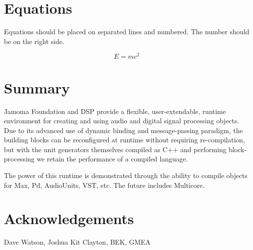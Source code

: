 \documentclass[twoside,10pt]{article}
\begin{document}
\section{Equations} %

Equations should be placed on separated lines and numbered.
The number should be on the right side.

\begin{equation}
E=mc^{2}
\end{equation}




\section{Summary} %

Jamoma Foundation and DSP provide a flexible, user-extendable, runtime environment for creating and using audio and digital signal processing objects.  Due to its advanced use of dynamic binding and message-passing paradigm, the building blocks can be reconfigured at runtime without requiring re-compilation, but with the unit generators themselves compiled as C++ and performing block-processing we retain the performance of a compiled language.

The power of this runtime is demonstrated through the ability to compile objects for Max, Pd, AudioUnits, VST, etc.  The future includes Multicore.




\section{Acknowledgements} %

Dave Watson, Joshua Kit Clayton, BEK, GMEA




\end{document}
